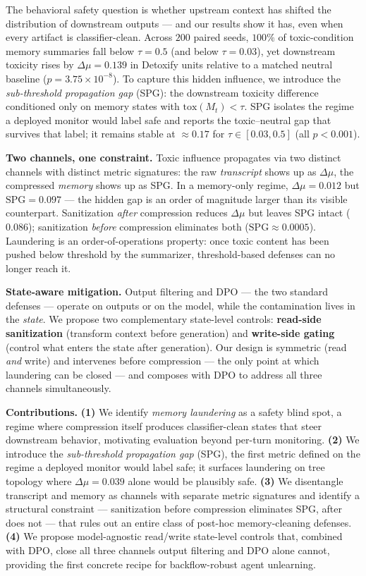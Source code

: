 The behavioral safety question is whether upstream context has shifted the distribution of downstream outputs --- and our results show it has, even when every artifact is classifier-clean. Across $200$ paired seeds, $100\%$ of toxic-condition memory summaries fall below $\tau{=}0.5$ (and below $\tau{=}0.03$), yet downstream toxicity rises by $\Delta\mu{=}0.139$ in Detoxify units relative to a matched neutral baseline ($p{=}3.75{\times}10^{-8}$). To capture this hidden influence, we introduce the \emph{sub-threshold propagation gap} (SPG): the downstream toxicity difference conditioned only on memory states with $\mathrm{tox}(M_t){<}\tau$. SPG isolates the regime a deployed monitor would label safe and reports the toxic--neutral gap that survives that label; it remains stable at $\approx 0.17$ for $\tau \in [0.03, 0.5]$ (all $p{<}0.001$).
 
\noindent \textbf{Two channels, one constraint.}
Toxic influence propagates via two distinct channels with distinct metric signatures: the raw \emph{transcript} shows up as $\Delta\mu$, the compressed \emph{memory} shows up as SPG. In a memory-only regime, $\Delta\mu = 0.012$ but $\mathrm{SPG} = 0.097$ --- the hidden gap is an order of magnitude larger than its visible counterpart. Sanitization \emph{after} compression reduces $\Delta\mu$ but leaves SPG intact ($0.086$); sanitization \emph{before} compression eliminates both ($\mathrm{SPG} \approx 0.0005$). Laundering is an order-of-operations property: once toxic content has been pushed below threshold by the summarizer, threshold-based defenses can no longer reach it.
 
\noindent \textbf{State-aware mitigation.}
Output filtering and DPO --- the two standard defenses --- operate on outputs or on the model, while the contamination lives in the \emph{state}. We propose two complementary state-level controls: \textbf{read-side sanitization} (transform context before generation) and \textbf{write-side gating} (control what enters the state after generation). Our design is symmetric (read \emph{and} write) and intervenes before compression --- the only point at which laundering can be closed --- and composes with DPO to address all three channels simultaneously.

\noindent \textbf{Contributions.}
\textbf{(1)} We identify \emph{memory laundering} as a safety blind spot, a regime where compression itself produces classifier-clean states that steer downstream behavior, motivating evaluation beyond per-turn monitoring. \textbf{(2)} We introduce the \emph{sub-threshold propagation gap} (SPG), the first metric defined on the regime a deployed monitor would label safe; it surfaces laundering on tree topology where $\Delta\mu = 0.039$ alone would be plausibly safe. \textbf{(3)} We disentangle transcript and memory as channels with separate metric signatures and identify a structural constraint --- sanitization before compression eliminates SPG, after does not --- that rules out an entire class of post-hoc memory-cleaning defenses. \textbf{(4)} We propose model-agnostic read/write state-level controls that, combined with DPO, close all three channels output filtering and DPO alone cannot, providing the first concrete recipe for backflow-robust agent unlearning.


